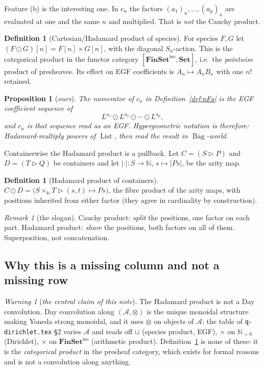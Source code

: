 \documentclass[11pt,a4paper]{article}
\newtheorem{proposition}[theorem]{Proposition}
\theoremstyle{definition}
\newtheorem{definition}[theorem]{Definition}
\theoremstyle{remark}
\newtheorem{remark}[theorem]{Remark}
\newtheorem{warning}[theorem]{Warning}
\newcommand{\NN}{\mathbb{N}}
\newcommand{\cat}[1]{\mathbf{#1}}
\newcommand{\Set}{\cat{Set}}
\newcommand{\FinSet}{\cat{FinSet}}
\newcommand{\iso}{\mathrm{iso}}
\newcommand{\con}{\mathrel{\vartriangleright}}
\newcommand{\norm}[1]{\lvert #1 \rvert}
\newcommand{\Had}{\odot}
\DeclareMathOperator{\List}{List}
\DeclareMathOperator{\Bag}{Bag}
\begin{document}
Feature (b) is the interesting one. In $c_n$ the factors $(a_1)_n,\dots,(a_p)_n$ are
evaluated at one and the same $n$ and multiplied. That is \emph{not} the Cauchy
product.

\begin{definition}[Cartesian/Hadamard product of species]\label{def:had}
For species $F, G$ let $(F \Had G)[n] = F[n] \times G[n]$, with the diagonal
$S_n$-action. This is the categorical product in the functor category
$[\FinSet^{\iso}, \Set]$, i.e.\ the \emph{pointwise} product of presheaves. Its effect
on EGF coefficients is $A_n \mapsto A_n B_n$ with one $n!$ retained.
\end{definition}

\begin{proposition}[\emph{ours}]\label{prop:had-upstairs}
The numerator of $c_n$ in Definition~\ref{def:pFq} is the EGF coefficient sequence of
\[
  L^{a_1} \Had L^{a_2} \Had \cdots \Had L^{a_p},
\]
and $c_n$ is that sequence read as an EGF. Hypergeometric notation is therefore:
\emph{Hadamard-multiply powers of $\List$, then read the result in $\Bag$-world.}
\end{proposition}

Containerwise the Hadamard product is a pullback. Let $C = (S \con P)$ and
$D = (T \con Q)$ be containers and let $\norm{\cdot} : S \to \NN$, $s \mapsto \norm{P s}$,
be the arity map.

\begin{definition}[Hadamard product of containers]\label{def:had-cont}
$C \Had D = \bigl(S \times_{\NN} T \con (s,t)\mapsto P s\bigr)$, the fibre product of
the arity maps, with positions inherited from either factor (they agree in
cardinality by construction).
\end{definition}

\begin{remark}[the slogan]\label{rem:slogan}
Cauchy product: \emph{split} the positions, one factor on each part. Hadamard
product: \emph{share} the positions, both factors on all of them. Superposition, not
concatenation.
\end{remark}

\subsection{Why this is a missing column and not a missing row}

\begin{warning}[\emph{the central claim of this note}]\label{warn:column}
The Hadamard product is not a Day convolution. Day convolution along
$(\mathcal{A},\otimes)$ is the unique monoidal structure making Yoneda strong
monoidal, and it uses $\otimes$ on objects of $\mathcal{A}$; the table of
\texttt{q-dirichlet.tex} \S2 varies $\mathcal{A}$ and reads off $\sqcup$ (species
product, EGF), $\times$ on $\NN_{>0}$ (Dirichlet), $\times$ on $\FinSet^{\iso}$
(arithmetic product). Definition~\ref{def:had} is none of these: it is the
\emph{categorical product} in the presheaf category, which exists for formal reasons
and is not a convolution along anything.
\end{warning}
\end{document}
